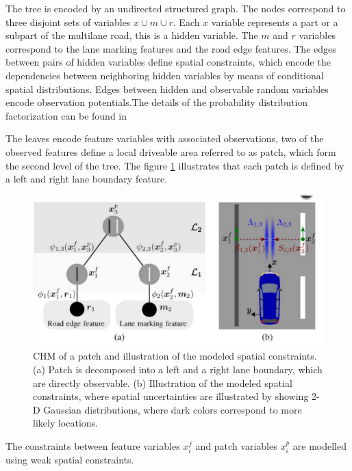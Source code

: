 \documentclass[conference]{IEEEtran}
\begin{document}
The tree is encoded by an undirected structured graph. The nodes correspond to three disjoint sets of variables $x \cup m \cup r$.  Each $x$ variable represents a part or a subpart of the multilane road, this is a hidden variable. The $m$ and $r$ variables correspond to the lane marking features and the road edge features. The edges between pairs of hidden variables define spatial constraints, which encode the dependencies between neighboring hidden variables by means of conditional spatial distributions. Edges between hidden and observable random variables encode observation potentials.The details of the probability distribution factorization can be found in \cite{lanesystem}

The leaves encode feature variables with associated observations, two of the observed features define a local driveable area referred to as patch, which form the second level of the tree. The figure \ref{fig11} illustrates that each patch is defined by a left and right lane boundary feature.

\begin{figure}[H]
	\centering
    \includegraphics[scale = 0.4]{pictures/patch.pdf}
	\caption{CHM of a patch and illustration of the modeled spatial constraints.(a) Patch is decomposed into a left and a right lane boundary, which are directly observable. (b) Illustration of the modeled spatial constraints, where spatial uncertainties are illustrated by showing 2-D Gaussian distributions, where dark colors correspond to more likely locations.\cite{lanesystem}}
	\label{fig11}
\end{figure}

The constraints between feature variables $x^f_i$ and patch variables $x^p_i$ are modelled using weak spatial constraints. 
\end{document}
